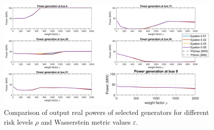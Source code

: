 \documentclass[11pt,a4paper,oneside,openany]{book}
\numberwithin{definition}{section}
\numberwithin{theorem}{section}
\numberwithin{problem}{section}
\begin{document}
\begin{figure}[!ht]
    \centering
    \includegraphics[scale=0.28]{immagini/RealPowerGen.png}
    \caption{Comparison of output real powers of selected generators for different risk levels $\rho$ and Wasserstein metric values $\varepsilon$.}
    \label{PowerOutput fig}
\end{figure}
\end{document}
